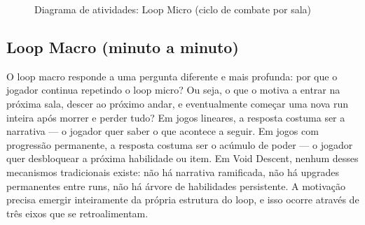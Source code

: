 \documentclass[12pt, a4paper]{article}
\begin{document}
\begin{figure}[H]
  \centering
  \caption{Diagrama de atividades: Loop Micro (ciclo de combate por sala)}
  \label{fig:microloop}
\end{figure}

\subsection{Loop Macro (minuto a minuto)}

O loop macro responde a uma pergunta diferente e mais profunda: por que o jogador continua repetindo o loop micro? Ou seja, o que o motiva a entrar na pr\'oxima sala, descer ao pr\'oximo andar, e eventualmente come\c{c}ar uma nova run inteira ap\'os morrer e perder tudo? Em jogos lineares, a resposta costuma ser a narrativa --- o jogador quer saber o que acontece a seguir. Em jogos com progress\~ao permanente, a resposta costuma ser o ac\'umulo de poder --- o jogador quer desbloquear a pr\'oxima habilidade ou item. Em Void Descent, nenhum desses mecanismos tradicionais existe: n\~ao h\'a narrativa ramificada, n\~ao h\'a upgrades permanentes entre runs, n\~ao h\'a \'arvore de habilidades persistente. A motiva\c{c}\~ao precisa emergir inteiramente da pr\'opria estrutura do loop, e isso ocorre atrav\'es de tr\^es eixos que se retroalimentam.
\end{document}
